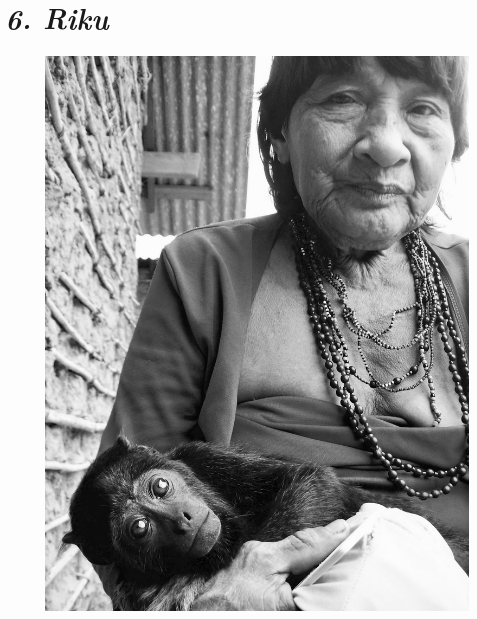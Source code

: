 
\chapter{\emph{6. Riku}}\label{riku}

\begin{figure}[H]
\centering
  \includegraphics[width=\textwidth]{./imgs/100_3892}
\end{figure}

